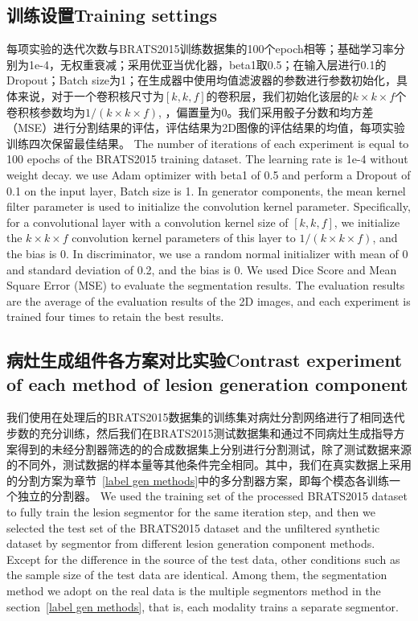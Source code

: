 \documentclass[letterpaper]{article} %
\begin{document}
\subsection{训练设置Training settings}
每项实验的迭代次数与BRATS2015训练数据集的100个epoch相等；基础学习率分别为1e-4，无权重衰减；采用优亚当优化器，beta1取0.5；在输入层进行0.1的Dropout；Batch size为1；在生成器中使用均值滤波器的参数进行参数初始化，具体来说，对于一个卷积核尺寸为$[k,k,f]$的卷积层，我们初始化该层的$k\times k\times f$个卷积核参数均为$1/(k\times k\times f)$, ，偏置量为0。我们采用骰子分数\cite{95dice1945measures}和均方差（MSE）\cite{94prasad1990the}进行分割结果的评估，评估结果为2D图像的评估结果的均值，每项实验训练四次保留最佳结果。
The number of iterations of each experiment is equal to 100 epochs of the BRATS2015 training dataset. The learning rate is 1e-4 without weight decay.  we use Adam optimizer with beta1 of 0.5 and perform a Dropout of 0.1 on the input layer, Batch size is 1. In generator components, the mean kernel filter parameter is used to initialize the convolution kernel parameter. Specifically, for a convolutional layer with a convolution kernel size of $[k,k,f]$, we initialize the $k\times k\times f$ convolution kernel parameters of this layer to $1/(k \times k\times f)$, and the bias is 0. In discriminator, we use a random normal initializer with mean of 0 and standard deviation of 0.2, and the bias is 0. We used Dice Score \cite{95dice1945measures} and Mean Square Error (MSE)\cite{94prasad1990the} to evaluate the segmentation results. The evaluation results are the average of the evaluation results of the 2D images, and each experiment is trained four times to retain the best results.

\subsection{病灶生成组件各方案对比实验Contrast experiment of each method of lesion generation component}
\label{label gen methods tests}
我们使用在处理后的BRATS2015数据集的训练集对病灶分割网络进行了相同迭代步数的充分训练，然后我们在BRATS2015测试数据集和通过不同病灶生成指导方案得到的未经分割器筛选的的合成数据集上分别进行分割测试，除了测试数据来源的不同外，测试数据的样本量等其他条件完全相同。其中，我们在真实数据上采用的分割方案为章节~\ref{label gen methods}中的多分割器方案，即每个模态各训练一个独立的分割器。
We used the training set of the processed BRATS2015 dataset to fully train the lesion segmentor for the same iteration step, and then we selected the test set of the BRATS2015 dataset and  the unfiltered synthetic dataset by segmentor from different lesion generation component methods. Except for the difference in the source of the test data, other conditions such as the sample size of the test data are identical. Among them, the segmentation method we adopt on the real data is the multiple segmentors method in the section~\ref{label gen methods}, that is, each modality trains a separate segmentor.
\end{document}

